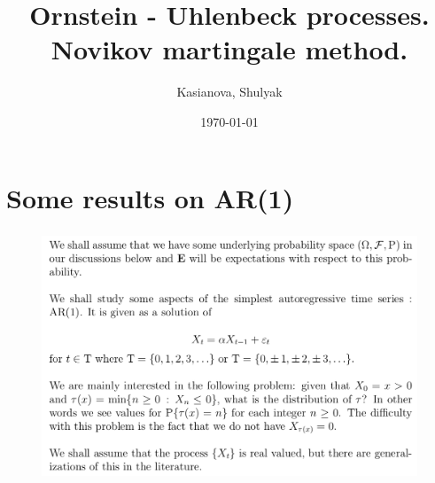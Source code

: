 \documentclass[c, dvipsnames, 8pt]{beamer}
\title[OU processes]  
{Ornstein - Uhlenbeck processes. \\  Novikov martingale method.}
\author[]{Kasianova, Shulyak}
\institute[]{Higher School of Economics}
\date{\today}
\begin{document}
	
	
\maketitle

\section{Some results on AR(1)}



\begin{frame}[shrink=5]


\frametitle{\insertsection} 
\begin{figure}
	\centering
	\includegraphics[width=1\linewidth]{screenshot002}
	\label{fig:screenshot001}
\end{figure}





\end{frame}
\end{document}
